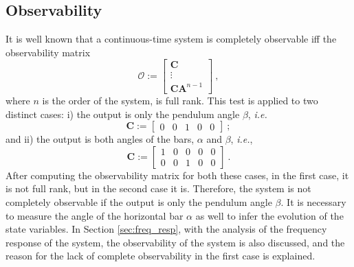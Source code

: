 \documentclass[letterpaper, 10 pt, conference]{ieeeconf}
\begin{document}
\subsection{Observability}\label{sec:obsvlty}
It is well known that a continuous-time system is completely observable iff the observability matrix
\begin{equation*}
    \mathcal{O} := \begin{bmatrix} \mathbf{C} \\ \vdots \\ \mathbf{C}\mathbf{A}^{n-1}
    \end{bmatrix}\:,
\end{equation*}
where $n$ is the order of the system, is full rank. This test is applied to two distinct cases: i) the output is only the pendulum angle $\beta$, \textit{i.e.} 
\begin{equation*}
    \mathbf{C} := \begin{bmatrix} 0 & 0 & 1 & 0 & 0\end{bmatrix}\:;
\end{equation*}
and ii) the output is both angles of the bars, $\alpha$ and $\beta$, \textit{i.e.},
\begin{equation}\label{eq:Cused}
    \mathbf{C} := \begin{bmatrix} 1 & 0 & 0 & 0 & 0\\ 0 & 0 & 1 & 0 & 0\end{bmatrix}\:.
\end{equation}
After computing the observability matrix for both these cases, in the first case, it is not full rank, but in the second case it is. Therefore, the system is not completely observable if the output is only the pendulum angle $\beta$. It is necessary to measure the angle of the horizontal bar $\alpha$ as well to infer the evolution of the state variables. In Section \ref{sec:freq_resp}, with the analysis of the frequency response of the system, the observability of the system is also discussed, and the reason for the lack of complete observability in the first case is explained.

\end{document}
